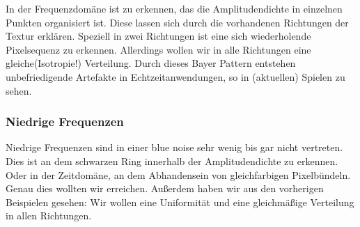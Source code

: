 In der Frequenzdomäne ist zu erkennen, das die Amplitudendichte in einzelnen
Punkten organisiert ist. Diese lassen sich durch die vorhandenen
Richtungen der Textur erklären. Speziell in zwei Richtungen ist eine sich
wiederholende Pixelsequenz zu erkennen.
Allerdings wollen wir in alle Richtungen eine gleiche(Isotropie!) 
Verteilung. Durch dieses Bayer Pattern entstehen unbefriedigende 
Artefakte in Echtzeitanwendungen, so in (aktuellen) Spielen 
\cite{bluenoisewronski} zu sehen.

\subsubsection{Niedrige Frequenzen}

Niedrige Frequenzen sind in einer blue noise sehr wenig bis gar nicht 
vertreten. Dies ist an dem schwarzen Ring innerhalb der Amplitudendichte
zu erkennen. Oder in der Zeitdomäne, an dem 
Abhandensein von gleichfarbigen Pixelbündeln. Genau dies wollten wir 
erreichen.
Außerdem haben wir aus den vorherigen Beispielen gesehen: Wir wollen 
eine Uniformität  und eine gleichmäßige Verteilung
in allen Richtungen.

